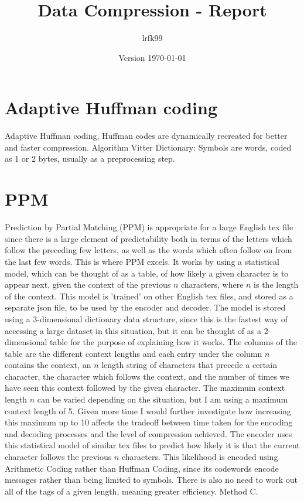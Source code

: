 \documentclass[a4paper, 11pt]{article}
\title{Data Compression - Report}
\date{Version \today}
\author{lrfk99}
\numberwithin{equation}{section}
\theoremstyle{plain}
\theoremstyle{definition}
\begin{document}
\maketitle



\section{Adaptive Huffman coding}
Adaptive Huffman coding, Huffman codes are dynamically recreated for better and faster compression.
Algorithm Vitter
Dictionary:
Symbols are words, coded as 1 or 2 bytes, usually as a preprocessing step.


\section{PPM}

Prediction by Partial Matching (PPM) is appropriate for a large English tex file since there is a large element of 
predictability both in terms of the letters which follow the preceding few letters, 
as well as the words which often follow on from the last few words. 
This is where PPM excels. 
It works by using a statistical model, which can be thought of as a table, 
of how likely a given character is to appear next, given the context of the previous $n$ characters, where $n$ is 
the length of the context. 
This model is 'trained' on other English tex files, and stored as a separate json file, 
to be used by the encoder and decoder. 
The model is stored using a 3-dimensional dictionary data structure, since this is the fastest way of accessing a large 
dataset in this situation, but it can be thought of as a 2-dimensional table for the purpose of explaining how it works. 
The columns of the table are the different context lengths and each entry under the column $n$ contains the context, 
an $n$ length string of characters that precede a certain character, the character which follows the context, 
and the number of times we have seen this context followed by the given character. 
The maximum context length $n$ can be varied depending on the situation, but I am using a maximum context length of 5. 
Given more time I would further investigate how increasing this maximum up to 10 affects the tradeoff between 
time taken for the encoding and decoding processes and the level of compression achieved. 
The encoder uses this statistical model of similar tex files to predict how likely it is that the current character follows 
the previous $n$ characters. 
This likelihood is encoded using Arithmetic Coding rather than Huffman Coding, since its codewords 
encode messages rather than being limited to symbols. 
There is also no need to work out all of the tags of a given length, meaning greater efficiency. 
Method C.
\end{document}
